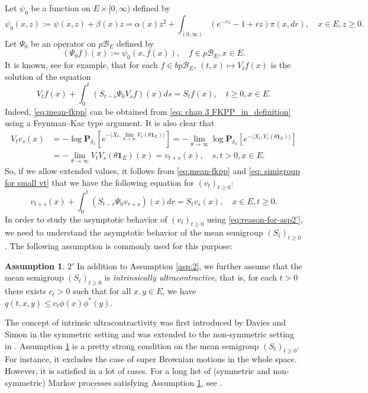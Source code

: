 \documentclass[UTF8]{pkuthss}
\theoremstyle{plain}
\theoremstyle{definition}
\newtheorem{asp}{Assumption}[chapter]
\numberwithin{equation}{section}
\begin{document}
	Let $\psi_0$ be a function on $E\times[0,\infty)$ defined by
\[
	\psi_0(x,z)
	:= \psi(x,z) + \beta(x)z
	= \alpha(x)z^2 + \int_{(0,\infty)}(e^{-rz}-1+rz) \pi(x,dr),
	\quad x\in E, z\geq 0.
\] 
	Let $\Psi_0$ be an operator on $p\mathscr B_E$ defined by
\[
	(\Psi_0 f)(x)
	:= \psi_0(x,f(x)),
	\quad f\in p\mathscr B_E, x\in E.
\]
	It is known, see \cite[Theorem 2.23]{Li2011Measure-valued} for example, that for each $f\in bp\mathscr B_E$, $(t,x) \mapsto V_tf(x)$ is the solution of the equation
\begin{equation}
\label{eq:mean-fkpp}
	V_t f(x) + \int_0^t (S_{t-s}\Psi_0 V_s f)(x) ds
	= S_t f(x),\quad t\geq 0, x\in E.
\end{equation}
	Indeed, \eqref{eq:mean-fkpp} can be obtained from \eqref{eq: chap 3 FKPP_in_definition} using a Feynman–Kac type  argument.
	It is also clear that
\begin{equation}\begin{split}\label{eq: simigroup for small vt}
	V_t v_s(x)
	&= -\log \mathbf P_{\delta_x}[e^{-\langle X_t,\lim_{\theta\to\infty } V_s(\theta \mathbf 1_E)\rangle}]
	= -\lim_{\theta \to \infty} \log \mathbf P_{\delta_x}[e^{-\langle X_t, V_s(\theta \mathbf 1_E)\rangle}]\\
	&= - \lim_{\theta\to\infty} V_t V_s(\theta \mathbf 1_E)(x)
	= v_{t+s}(x),
	\quad s,t>0, x\in E.
\end{split}\end{equation}
	So, if we allow extended values, it follows from  \eqref{eq:mean-fkpp} and \eqref{eq: simigroup for small vt} that we have the following equation for $(v_t)_{t\geq 0}$:
\begin{equation}\label{eq:reason-for-asp2'}
	v_{t+s}(x) + \int_0^t  (S_{t-r} \Psi_0 v_{r+s})(x)  dr
	= S_tv_s(x),
	\quad x\in E,t\geq 0.
\end{equation}
	 In order to study the asymptotic behavior of $(v_t)_{t\geq 0}$ using \eqref{eq:reason-for-asp2'},
	we need to understand the asymptotic behavior of the mean semigroup $(S_t)_{t\geq 0}$. The following assumption is commonly used for this purpose:
\begin{asp}{$2'$}
\label{asp:2'}
	In addition to Assumption \ref{asp:2}, we further assume that the mean semigroup $(S_t)_{t\geq 0}$ is \emph{intrinsically ultracontractive},
	that is, for each $t>0$ there exists $c_t>0$ such that for all $x,y\in E$, we have $q(t,x,y)\leq c_t\phi(x)\phi^*(y)$.
\end{asp}
	

		The concept of intrinsic ultracontractivity was first introduced by Davies and Simon \cite{DaviesSimon1984Ultracontractivity} in the symmetric setting and was extended to the non-symmetric setting in \cite{KimSong2008Intrinsic}.  Assumption 	\ref{asp:2'} is a pretty strong condition on the mean semigroup $(S_t)_{t\geq 0}$. For instance, it excludes the case of super Brownian motions in the whole space. However, it is satisfied in a lot of cases.
	For a long list of (symmetric and non-symmetric) Markov processes satisfying Assumption \ref{asp:2'}, see \cite{RenSongZhang2015Limit}.
\end{document}

